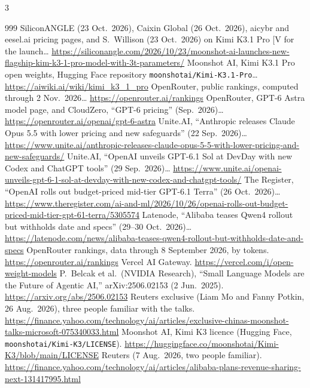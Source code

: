 \begin{multicols}{3}
\begin{thebibliography}{999}
 SiliconANGLE (23 Oct.\ 2026), Caixin Global (26 Oct.\ 2026), aicybr and eesel.ai pricing pages, and S.~Willison (23 Oct.\ 2026) on Kimi K3.1 Pro [V for the launch… \url{https://siliconangle.com/2026/10/23/moonshot-ai-launches-new-flagship-kim-k3-1-pro-model-with-3t-parameters/}
 Moonshot AI, Kimi K3.1 Pro open weights, Hugging Face repository \texttt{moonshotai/Kimi-K3.1-Pro}… \url{https://aiwiki.ai/wiki/kimi_k3_1_pro}
 OpenRouter, public rankings, computed through 2 Nov.\ 2026… \url{https://openrouter.ai/rankings}
 OpenRouter, GPT-6 Astra model page, and CloudZero, ``GPT-6 pricing'' (Sep.\ 2026)… \url{https://openrouter.ai/openai/gpt-6-astra}
 Unite.AI, ``Anthropic releases Claude Opus 5.5 with lower pricing and new safeguards'' (22 Sep.\ 2026)… \url{https://www.unite.ai/anthropic-releases-claude-opus-5-5-with-lower-pricing-and-new-safeguards/}
 Unite.AI, ``OpenAI unveils GPT-6.1 Sol at DevDay with new Codex and ChatGPT tools'' (29 Sep.\ 2026)… \url{https://www.unite.ai/openai-unveils-gpt-6-1-sol-at-devday-with-new-codex-and-chatgpt-tools/}
 The Register, ``OpenAI rolls out budget-priced mid-tier GPT-6.1 Terra'' (26 Oct.\ 2026)… \url{https://www.theregister.com/ai-and-ml/2026/10/26/openai-rolls-out-budget-priced-mid-tier-gpt-61-terra/5305574}
 Latenode, ``Alibaba teases Qwen4 rollout but withholds date and specs'' (29--30 Oct.\ 2026)… \url{https://latenode.com/news/alibaba-teases-qwen4-rollout-but-withholds-date-and-specs}
 OpenRouter rankings, data through 8 September 2026, by tokens. \url{https://openrouter.ai/rankings}
 Vercel AI Gateway. \url{https://vercel.com/i/open-weight-models}
 P.~Belcak et al.\ (NVIDIA Research), ``Small Language Models are the Future of Agentic AI,'' arXiv:2506.02153 (2 Jun.\ 2025). \url{https://arxiv.org/abs/2506.02153}
 Reuters exclusive (Liam Mo and Fanny Potkin, 26 Aug.\ 2026), three people familiar with the talks. \url{https://finance.yahoo.com/technology/ai/articles/exclusive-chinas-moonshot-talks-microsoft-075340033.html}
 Moonshot AI, Kimi K3 licence (Hugging Face, \texttt{moonshotai/Kimi-K3/LICENSE}). \url{https://huggingface.co/moonshotai/Kimi-K3/blob/main/LICENSE}
 Reuters (7 Aug.\ 2026, two people familiar). \url{https://finance.yahoo.com/technology/ai/articles/alibaba-plans-revenue-sharing-next-131417995.html}

\end{thebibliography}
\end{multicols}
